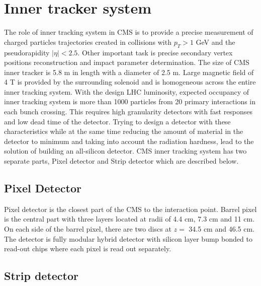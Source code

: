 
\section{Inner tracker system}

The role of inner tracking system in CMS is to provide a precise measurement of charged particles trajectories created in collisions with $p_T>1$ GeV and the pseudorapidity $|\eta|<2.5$. Other important task is precise secondary vertex positions reconstruction and impact parameter determination. The size of CMS inner tracker is 5.8 m in length with a diameter of 2.5 m. Large magnetic field of 4 T is provided by the surrounding solenoid and is homogeneous across the entire inner tracking system. With the design LHC luminosity, expected occupancy of inner tracking system is more than 1000 particles from 20 primary interactions in each bunch crossing. This requires high granularity detectors with fast responses and low dead time of the detector. Trying to design a detector with these characteristics while at the same time reducing the amount of material in the detector to minimum and taking into account the radiation hardness, lead to the solution of building an all-silicon detector. CMS inner tracking system has two separate parts, Pixel detector and Strip detector which are described below.    


\subsection{Pixel Detector}

Pixel detector is the closest part of the CMS to the interaction point. Barrel pixel is the central part with three layers located at radii of 4.4 cm, 7.3 cm and 11 cm. On each side of the barrel pixel, there are two discs at $z=$ 34.5 cm and 46.5 cm. The detector is fully modular hybrid detector with silicon layer bump bonded to read-out chips where each pixel is read out separately. 


\subsection{Strip detector}

